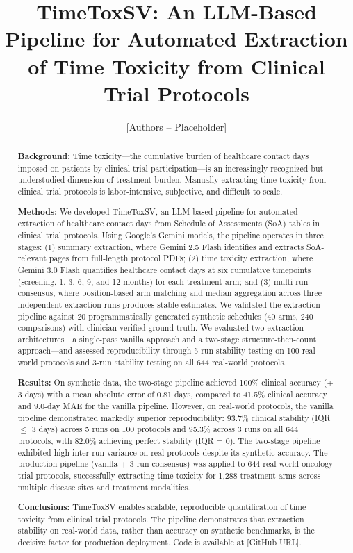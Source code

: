 \documentclass[11pt]{article}
\title{\textbf{TimeToxSV: An LLM-Based Pipeline for Automated Extraction of Time Toxicity from Clinical Trial Protocols}}
\author{
    [Authors -- Placeholder] \\
    [Affiliations -- Placeholder]
}
\date{}
\begin{document}
\maketitle

\begin{abstract}
\textbf{Background:} Time toxicity---the cumulative burden of healthcare contact days imposed on patients by clinical trial participation---is an increasingly recognized but understudied dimension of treatment burden. Manually extracting time toxicity from clinical trial protocols is labor-intensive, subjective, and difficult to scale.

\textbf{Methods:} We developed TimeToxSV, an LLM-based pipeline for automated extraction of healthcare contact days from Schedule of Assessments (SoA) tables in clinical trial protocols. Using Google's Gemini models, the pipeline operates in three stages: (1) summary extraction, where Gemini 2.5 Flash identifies and extracts SoA-relevant pages from full-length protocol PDFs; (2) time toxicity extraction, where Gemini 3.0 Flash quantifies healthcare contact days at six cumulative timepoints (screening, 1, 3, 6, 9, and 12 months) for each treatment arm; and (3) multi-run consensus, where position-based arm matching and median aggregation across three independent extraction runs produces stable estimates. We validated the extraction pipeline against 20 programmatically generated synthetic schedules (40 arms, 240 comparisons) with clinician-verified ground truth. We evaluated two extraction architectures---a single-pass vanilla approach and a two-stage structure-then-count approach---and assessed reproducibility through 5-run stability testing on 100 real-world protocols and 3-run stability testing on all 644 real-world protocols.

\textbf{Results:} On synthetic data, the two-stage pipeline achieved 100\% clinical accuracy ($\pm$3 days) with a mean absolute error of 0.81 days, compared to 41.5\% clinical accuracy and 9.0-day MAE for the vanilla pipeline. However, on real-world protocols, the vanilla pipeline demonstrated markedly superior reproducibility: 93.7\% clinical stability (IQR $\leq$ 3 days) across 5 runs on 100 protocols and 95.3\% across 3 runs on all 644 protocols, with 82.0\% achieving perfect stability (IQR = 0). The two-stage pipeline exhibited high inter-run variance on real protocols despite its synthetic accuracy. The production pipeline (vanilla + 3-run consensus) was applied to 644 real-world oncology trial protocols, successfully extracting time toxicity for 1,288 treatment arms across multiple disease sites and treatment modalities.

\textbf{Conclusions:} TimeToxSV enables scalable, reproducible quantification of time toxicity from clinical trial protocols. The pipeline demonstrates that extraction stability on real-world data, rather than accuracy on synthetic benchmarks, is the decisive factor for production deployment. Code is available at [GitHub URL].
\end{abstract}
\end{document}
